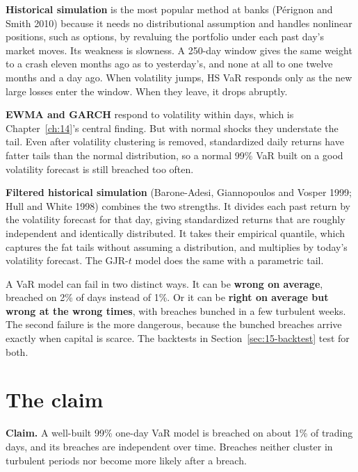 \textbf{Historical simulation} is the most popular method at banks (P\'erignon and Smith 2010) because it needs no distributional assumption and handles nonlinear positions, such as options, by revaluing the portfolio under each past day's market moves. Its weakness is slowness. A 250-day window gives the same weight to a crash eleven months ago as to yesterday's, and none at all to one twelve months and a day ago. When volatility jumps, HS VaR responds only as the new large losses enter the window. When they leave, it drops abruptly.

\textbf{EWMA and GARCH} respond to volatility within days, which is Chapter~\ref{ch:14}'s central finding. But with normal shocks they understate the tail. Even after volatility clustering is removed, standardized daily returns have fatter tails than the normal distribution, so a normal 99\% VaR built on a good volatility forecast is still breached too often.

\textbf{Filtered historical simulation} (Barone-Adesi, Giannopoulos and Vosper 1999; Hull and White 1998) combines the two strengths. It divides each past return by the volatility forecast for that day, giving standardized returns that are roughly independent and identically distributed. It takes their empirical quantile, which captures the fat tails without assuming a distribution, and multiplies by today's volatility forecast. The GJR-$t$ model does the same with a parametric tail.

A VaR model can fail in two distinct ways. It can be \textbf{wrong on average}, breached on 2\% of days instead of 1\%. Or it can be \textbf{right on average but wrong at the wrong times}, with breaches bunched in a few turbulent weeks. The second failure is the more dangerous, because the bunched breaches arrive exactly when capital is scarce. The backtests in Section~\ref{sec:15-backtest} test for both.

\section{The claim}
\label{sec:15-claim}

\begin{callout}
\textbf{Claim.} A well-built 99\% one-day VaR model is breached on about 1\% of trading days, and its breaches are independent over time. Breaches neither cluster in turbulent periods nor become more likely after a breach.
\end{callout}

